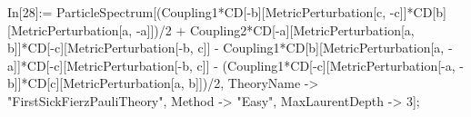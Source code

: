 In[28]:= ParticleSpectrum[(Coupling1*CD[-b][MetricPerturbation[c, -c]]*CD[b][MetricPerturbation[a, -a]])/2 + Coupling2*CD[-a][MetricPerturbation[a, b]]*CD[-c][MetricPerturbation[-b, c]] - Coupling1*CD[b][MetricPerturbation[a, -a]]*CD[-c][MetricPerturbation[-b, c]] - (Coupling1*CD[-c][MetricPerturbation[-a, -b]]*CD[c][MetricPerturbation[a, b]])/2, TheoryName -> "FirstSickFierzPauliTheory", Method -> "Easy", MaxLaurentDepth -> 3]; 